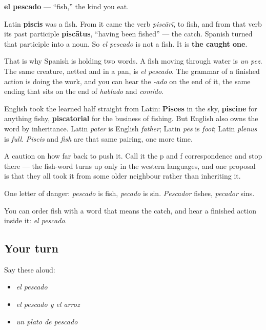\begin{cousinweb}
\textbf{el pescado} — \textquotedblleft{}fish,\textquotedblright{} the kind you eat.

Latin \textbf{piscis} was a fish. From it came the verb \emph{piscārī}, to fish, and from that verb its past participle \textbf{piscātus}, \textquotedblleft{}having been fished\textquotedblright{} — the catch. Spanish turned that participle into a noun. So \emph{el pescado} is not a fish. It is \textbf{the caught one}.

That is why Spanish is holding two words. A fish moving through water is \emph{un pez}. The same creature, netted and in a pan, is \emph{el pescado}. The grammar of a finished action is doing the work, and you can hear the \emph{-ado} on the end of it, the same ending that sits on the end of \emph{hablado} and \emph{comido}.

English took the learned half straight from Latin: \textbf{Pisces} in the sky, \textbf{piscine} for anything fishy, \textbf{piscatorial} for the business of fishing. But English also owns the word by inheritance. Latin \emph{pater} is English \emph{father}; Latin \emph{pēs} is \emph{foot}; Latin \emph{plēnus} is \emph{full}. \emph{Piscis} and \emph{fish} are that same pairing, one more time.

A caution on how far back to push it. Call it the p and f correspondence and stop there — the fish-word turns up only in the western languages, and one proposal is that they all took it from some older neighbour rather than inheriting it.

One letter of danger: \emph{pescado} is fish, \emph{pecado} is sin. \emph{Pescador} fishes, \emph{pecador} sins.
\end{cousinweb}

\begin{grammarlens}[title={What you've built}]
You can order fish with a word that means the catch, and hear a finished action inside it: \emph{el pescado}.
\end{grammarlens}

\subsection*{Your turn}
Say these aloud:

\begin{itemize}
\raggedright
  \item \emph{el pescado}
  \item \emph{el pescado y el arroz}
  \item \emph{un plato de pescado}
\end{itemize}

